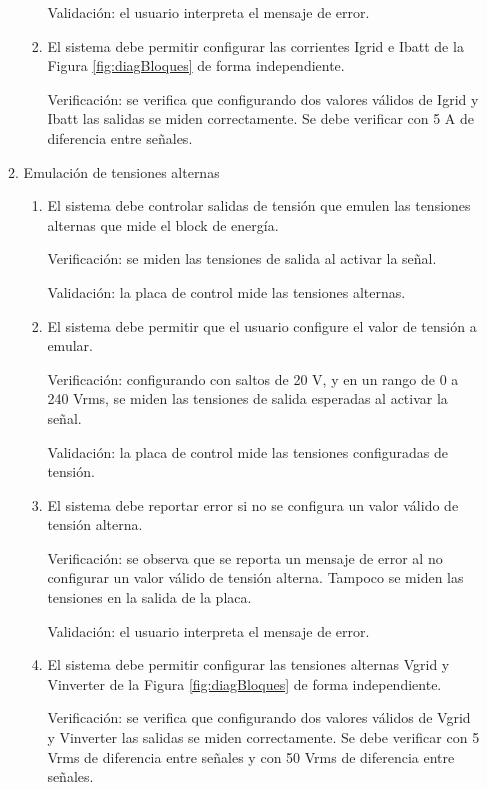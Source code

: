 \documentclass[
11pt, %
codirector, %
]{charter}
\begin{document}
\begin{enumerate}
\begin{enumerate}
\begin{enumerate}
			                  Validación: el usuario interpreta el mensaje de error.
			            \item El sistema debe permitir configurar las corrientes Igrid e Ibatt de la Figura \ref{fig:diagBloques} de forma independiente.

			                  Verificación: se verifica que configurando dos valores válidos de Igrid y Ibatt las salidas se miden correctamente. Se debe verificar con 5 A de diferencia entre señales.
		            \end{enumerate}
		      \item Emulación de tensiones alternas
		            \begin{enumerate}
			            \item El sistema debe controlar salidas de tensión que emulen las tensiones alternas que mide el block de energía.

			                  Verificación: se miden las tensiones de salida al activar la señal.

			                  Validación: la placa de control mide las tensiones alternas.
			            \item El sistema debe permitir que el usuario configure el valor de tensión a emular.

			                  Verificación: configurando con saltos de 20 V, y en un rango de 0 a 240 Vrms, se miden las tensiones de salida esperadas al activar la señal.

			                  Validación: la placa de control mide las tensiones configuradas de tensión.
			            \item El sistema debe reportar error si no se configura un valor válido de tensión alterna.

			                  Verificación: se observa que se reporta un mensaje de error al no configurar un valor válido de tensión alterna. Tampoco se miden las tensiones en la salida de la placa.

			                  Validación: el usuario interpreta el mensaje de error.
			            \item El sistema debe permitir configurar las tensiones alternas Vgrid y Vinverter de la Figura \ref{fig:diagBloques} de forma independiente.

			                  Verificación: se verifica que configurando dos valores válidos de Vgrid y Vinverter las salidas se miden correctamente. Se debe verificar con 5 Vrms de diferencia entre señales y con 50 Vrms de diferencia entre señales.


\end{enumerate}
\end{enumerate}
\end{enumerate}
\end{document}
